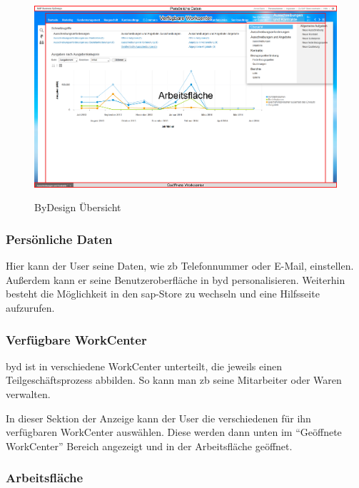 \begin{figure}[H]
	\begin{center}
	\includegraphics[width=1.0\textwidth]{grafiken/ByDesign-Ubersicht.png}
	\caption{ByDesign Übersicht}
	\vspace{-10pt}
	\label{abb:byd-overview}
	\end{center}
\end{figure}

\subsubsection{Persönliche Daten}

Hier kann der User seine Daten, wie \gls{zb} Telefonnummer oder E-Mail, einstellen. Außerdem kann er seine Benutzeroberfläche in \gls{byd} personalisieren. Weiterhin besteht die Möglichkeit in den \gls{sap}-Store zu wechseln und eine Hilfsseite aufzurufen.

\subsubsection{Verfügbare WorkCenter}

\gls{byd} ist in verschiedene WorkCenter unterteilt, die jeweils einen Teilgeschäftsprozess abbilden. So kann man \gls{zb} seine Mitarbeiter oder Waren verwalten.

In dieser Sektion der Anzeige kann der User die verschiedenen für ihn verfügbaren WorkCenter auswählen. Diese werden dann unten im "`Geöffnete WorkCenter"' Bereich angezeigt und in der Arbeitsfläche geöffnet.

\subsubsection{Arbeitsfläche}

